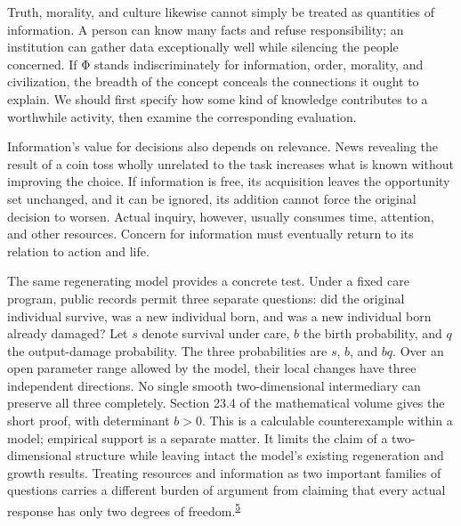 \documentclass[
  english,
  11pt,
  oneside]{book}
\begin{document}
Truth, morality, and culture likewise cannot simply be treated as quantities of information. A person can know many facts and refuse responsibility; an institution can gather data exceptionally well while silencing the people concerned. If Φ stands indiscriminately for information, order, morality, and civilization, the breadth of the concept conceals the connections it ought to explain. We should first specify how some kind of knowledge contributes to a worthwhile activity, then examine the corresponding evaluation.

Information's value for decisions also depends on relevance. News revealing the result of a coin toss wholly unrelated to the task increases what is known without improving the choice. If information is free, its acquisition leaves the opportunity set unchanged, and it can be ignored, its addition cannot force the original decision to worsen. Actual inquiry, however, usually consumes time, attention, and other resources. Concern for information must eventually return to its relation to action and life.

The same regenerating model provides a concrete test. Under a fixed care program, public records permit three separate questions: did the original individual survive, was a new individual born, and was a new individual born already damaged? Let \(s\) denote survival under care, \(b\) the birth probability, and \(q\) the output-damage probability. The three probabilities are \(s\), \(b\), and \(bq\). Over an open parameter range allowed by the model, their local changes have three independent directions. No single smooth two-dimensional intermediary can preserve all three completely. Section 23.4 of the mathematical volume gives the short proof, with determinant \(b>0\). This is a calculable counterexample within a model; empirical support is a separate matter. It limits the claim of a two-dimensional structure while leaving intact the model's existing regeneration and growth results. Treating resources and information as two important families of questions carries a different burden of argument from claiming that every actual response has only two degrees of freedom.\textsuperscript{\hyperlink{ph-note-5}{5}}

\begingroup{}
\end{document}
